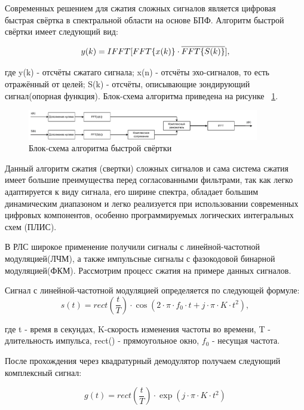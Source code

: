 Современных решением для сжатия сложных сигналов является цифровая быстрая свёртка в спектральной области на основе БПФ. Алгоритм быстрой свёртки имеет следующий вид:

\begin{equation}	
	y(k) = IFFT[FFT\{x(k)\} \cdot \overline{FFT\{S(k)\}}],
\end{equation}

где y(k) - отсчёты сжатаго сигнала; x(n) - отсчёты эхо-сигналов, то есть отражённый от целей; S(k) - отсчёты, описывающие зондирующий сигнал(опорная функция). Блок-схема алгоритма приведена на рисунке ~\ref{fft_conv}.

\begin{figure}[h]
	\centering
	\includegraphics[width=0.9\textwidth]{fft_conv.pdf}
	\caption{Блок-схема алгоритма быстрой свёртки}
	\label{fft_conv}
\end{figure}

Данный алгоритм сжатия (свертки) сложных сигналов и сама система сжатия имеет большие преимущества перед согласованными фильтрами, так как легко адаптируется к виду сигнала, его ширине спектра, обладает большим динамическим диапазоном и легко реализуется при использовании современных цифровых компонентов, особенно программируемых логических интегральных схем (ПЛИС).

В РЛС широкое применение получили сигналы с линейной-частотной модуляцией(ЛЧМ), а также импульсные сигналы с фазокодовой бинарной модуляцией(ФКМ). Рассмотрим процесс сжатия на примере данных сигналов.

Сигнал с линейной-частотной модуляцией определяется по следующей формуле:
\begin{equation}	
	s(t) = rect(\frac{t}{T}) \cdot \cos(2 \cdot \pi \cdot f_0 \cdot t + j \cdot \pi \cdot K \cdot t^{2}),
\end{equation}

где t - время в секундах, K-скорость изменения частоты во времени, T - длительность импульса, rect() - прямоугольное окно, \(f_0\) - несущая частота.

После прохождения через квадратурный демодулятор получаем следующий комплексный сигнал:

\begin{equation}	
	g(t) = rect(\frac{t}{T}) \cdot \exp(j \cdot \pi \cdot K \cdot t^{2})
\end{equation}

